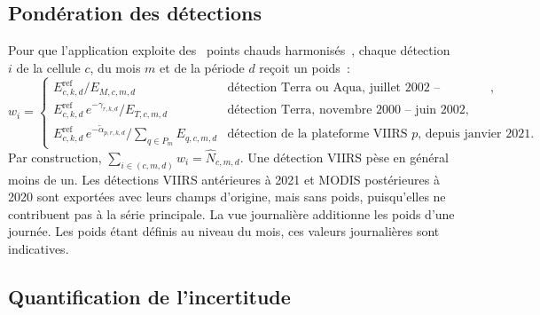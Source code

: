 \documentclass[11pt,a4paper]{article}
\newcommand{\og}{\guillemotleft~}
\newcommand{\fg}{~\guillemotright}
\begin{document}
\subsection{Pondération des détections}\label{sec:poids}

Pour que l'application exploite des \og points chauds harmonisés\fg, chaque détection $i$ de la cellule $c$, du mois $m$ et de la période $d$ reçoit un poids~:
\begin{equation}
  w_i = \begin{cases}
    E^{\text{ref}}_{c,k,d} \big/ E_{M,c,m,d} & \text{détection Terra ou Aqua, juillet 2002 -- décembre 2020},\\[3pt]
    E^{\text{ref}}_{c,k,d}\, e^{-\gamma_{r,k,d}} \big/ E_{T,c,m,d} & \text{détection Terra, novembre 2000 -- juin 2002},\\[3pt]
    E^{\text{ref}}_{c,k,d}\, e^{-\tilde\alpha_{p,r,k,d}} \big/ \sum_{q\in P_m} E_{q,c,m,d} & \text{détection de la plateforme VIIRS } p\text{, depuis janvier 2021}.
  \end{cases}
\end{equation}
Par construction, $\sum_{i\in(c,m,d)} w_i = \hat N_{c,m,d}$. Une détection VIIRS pèse en général moins de un. Les détections VIIRS antérieures à 2021 et MODIS postérieures à 2020 sont exportées avec leurs champs d'origine, mais sans poids, puisqu'elles ne contribuent pas à la série principale. La vue journalière additionne les poids d'une journée. Les poids étant définis au niveau du mois, ces valeurs journalières sont indicatives.

\subsection{Quantification de l'incertitude}\label{sec:incertitude}
\end{document}
